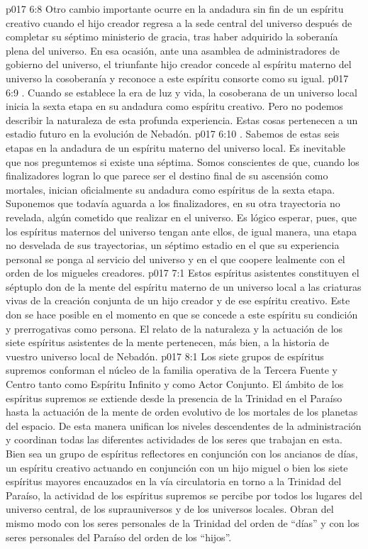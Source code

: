 \vs p017 6:8  Otro cambio importante ocurre en la andadura sin fin de un espíritu creativo cuando el hijo creador regresa a la sede central del universo después de completar su séptimo ministerio de gracia, tras haber adquirido la soberanía plena del universo. En esa ocasión, ante una asamblea de administradores de gobierno del universo, el triunfante hijo creador concede al espíritu materno del universo la cosoberanía y reconoce a este espíritu consorte como su igual.
\vs p017 6:9 . Cuando se establece la era de luz y vida, la cosoberana de un universo local inicia la sexta etapa en su andadura como espíritu creativo. Pero no podemos describir la naturaleza de esta profunda experiencia. Estas cosas pertenecen a un estadio futuro en la evolución de Nebadón.
\vs p017 6:10 . Sabemos de estas seis etapas en la andadura de un espíritu materno del universo local. Es inevitable que nos preguntemos si existe una séptima. Somos conscientes de que, cuando los finalizadores logran lo que parece ser el destino final de su ascensión como mortales, inician oficialmente su andadura como espíritus de la sexta etapa. Suponemos que todavía aguarda a los finalizadores, en su otra trayectoria no revelada, algún cometido que realizar en el universo. Es lógico esperar, pues, que los espíritus maternos del universo tengan ante ellos, de igual manera, una etapa no desvelada de sus trayectorias, un séptimo estadio en el que su experiencia personal se ponga al servicio del universo y en el que coopere lealmente con el orden de los migueles creadores.
\vs p017 7:1 Estos espíritus asistentes constituyen el séptuplo don de la mente del espíritu materno de un universo local a las criaturas vivas de la creación conjunta de un hijo creador y de ese espíritu creativo. Este don se hace posible en el momento en que se concede a este espíritu su condición y prerrogativas como persona. El relato de la naturaleza y la actuación de los siete espíritus asistentes de la mente pertenecen, más bien, a la historia de vuestro universo local de Nebadón.
\vs p017 8:1 Los siete grupos de espíritus supremos conforman el núcleo de la familia operativa de la Tercera Fuente y Centro tanto como Espíritu Infinito y como Actor Conjunto. El ámbito de los espíritus supremos se extiende desde la presencia de la Trinidad en el Paraíso hasta la actuación de la mente de orden evolutivo de los mortales de los planetas del espacio. De esta manera unifican los niveles descendentes de la administración y coordinan todas las diferentes actividades de los seres que trabajan en esta. Bien sea un grupo de espíritus reflectores en conjunción con los ancianos de días, un espíritu creativo actuando en conjunción con un hijo miguel o bien los siete espíritus mayores encauzados en la vía circulatoria en torno a la Trinidad del Paraíso, la actividad de los espíritus supremos se percibe por todos los lugares del universo central, de los suprauniversos y de los universos locales. Obran del mismo modo con los seres personales de la Trinidad del orden de “días” y con los seres personales del Paraíso del orden de los “hijos”.
